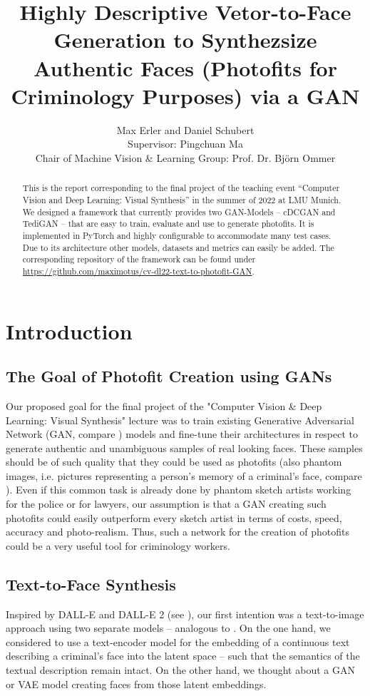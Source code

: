 \documentclass[12pt, a4paper]{article}
\title{Highly Descriptive Vetor-to-Face Generation to Synthezsize Authentic Faces (Photofits for Criminology Purposes) via a GAN}
\author{Max Erler and Daniel Schubert\\
Supervisor: Pingchuan Ma\\
Chair of Machine Vision \& Learning Group: Prof. Dr. Björn Ommer}
\begin{document}
\maketitle
\begin{abstract}
    This is the report corresponding to the final project of the teaching event ``Computer Vision and Deep Learning: Visual Synthesis'' in the summer of 2022 at LMU Munich.
    We designed a framework that currently provides two GAN-Models -- cDCGAN and TediGAN -- that are easy to train, evaluate and use to generate photofits.
    It is implemented in PyTorch and highly configurable to accommodate many test cases.
    Due to its architecture other models, datasets and metrics can easily be added.
    The corresponding repository of the framework can be found under
    \href{https://github.com/maximotus/cv-dl22-text-to-photofit-GAN}{https://github.com/maximotus/cv-dl22-text-to-photofit-GAN}.
    \end{abstract}
\pagebreak
\tableofcontents
\pagebreak
\section{Introduction}
\subsection{The Goal of Photofit Creation using GANs}
\label{goal}
Our proposed goal for the final project of the "Computer Vision \& Deep Learning: Visual Synthesis" lecture was to train 
existing Generative Adversarial Network (GAN, compare \cite{gan}) models and fine-tune their architectures in respect to generate authentic
and unambiguous samples of real looking faces. These samples should be of such quality that they could be used as
photofits (also phantom images, i.e. pictures representing a person's memory of a criminal's face, compare \cite{photofitDef}).
Even if this common task is already done by phantom sketch artists working for the police or for lawyers, our assumption
is that a GAN creating such photofits could easily outperform every sketch artist in terms of costs, speed, accuracy and photo-realism.
Thus, such a network for the creation of photofits could be a very useful tool for criminology workers.

\subsection{Text-to-Face Synthesis}
Inspired by DALL-E and DALL-E 2 (see \cite{dallE}), our first intention was a text-to-image approach
using two separate models -- analogous to \cite{Xia_2021_CVPR}. On the one hand, we considered to
use a text-encoder model for the embedding of a continuous text describing a criminal's face into the latent space --
such that the semantics of the textual description remain intact. On the other hand, we thought about a GAN or VAE model
creating faces from those latent embeddings.
\end{document}
